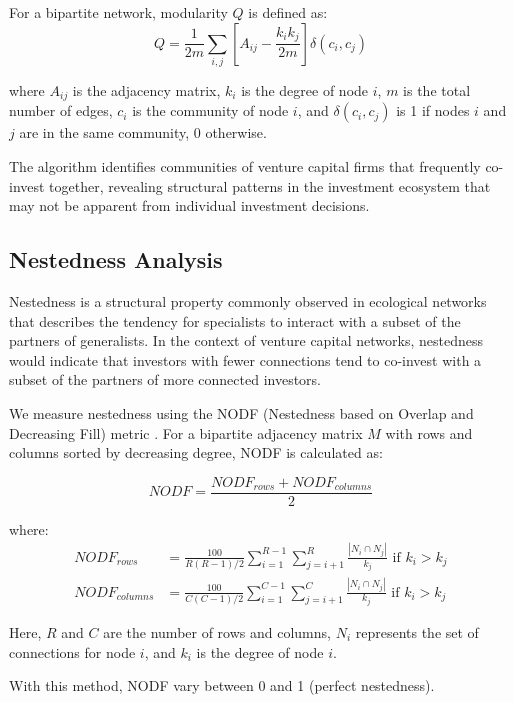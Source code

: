 \documentclass[12pt]{article}
\begin{document}
For a bipartite network, modularity $Q$ is defined as:
\begin{equation}
Q = \frac{1}{2m} \sum_{i,j} \left[ A_{ij} - \frac{k_i k_j}{2m} \right] \delta(c_i, c_j)
\end{equation}

where $A_{ij}$ is the adjacency matrix, $k_i$ is the degree of node $i$, $m$ is the total number of edges, $c_i$ is the community of node $i$, and $\delta(c_i, c_j)$ is 1 if nodes $i$ and $j$ are in the same community, 0 otherwise.

The algorithm identifies communities of venture capital firms that frequently co-invest together, revealing structural patterns in the investment ecosystem that may not be apparent from individual investment decisions.

\subsection{Nestedness Analysis}

Nestedness is a structural property commonly observed in ecological networks \cite{AlmeidaNeto2008} that describes the tendency for specialists to interact with a subset of the partners of generalists. In the context of venture capital networks, nestedness would indicate that investors with fewer connections tend to co-invest with a subset of the partners of more connected investors.

We measure nestedness using the NODF (Nestedness based on Overlap and Decreasing Fill) metric \cite{AlmeidaNeto2008}. For a bipartite adjacency matrix $M$ with rows and columns sorted by decreasing degree, NODF is calculated as:

\begin{equation}
NODF = \frac{NODF_{rows} + NODF_{columns}}{2}
\end{equation}

where:
\begin{align}
NODF_{rows} &= \frac{100}{R(R-1)/2} \sum_{i=1}^{R-1} \sum_{j=i+1}^{R} \frac{|N_i \cap N_j|}{k_j} \text{ if } k_i > k_j \\
NODF_{columns} &= \frac{100}{C(C-1)/2} \sum_{i=1}^{C-1} \sum_{j=i+1}^{C} \frac{|N_i \cap N_j|}{k_j} \text{ if } k_i > k_j
\end{align}

Here, $R$ and $C$ are the number of rows and columns, $N_i$ represents the set of connections for node $i$, and $k_i$ is the degree of node $i$.

With this method, NODF vary between 0 and 1 (perfect nestedness).
\end{document}
